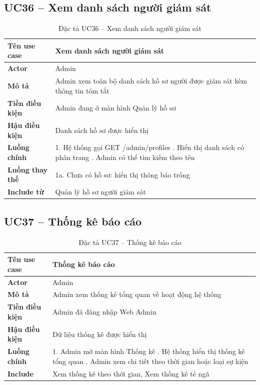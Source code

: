 \subsection*{UC36 -- Xem danh sách người giám sát}
\begin{table}[H]
    \captionsetup{justification=raggedright, singlelinecheck=false}
    \caption{Đặc tả UC36 -- Xem danh sách người giám sát}
\centering
\begin{tabular}{|p{3.5cm}|p{10cm}|}
\hline
\textbf{Tên use case} & Xem danh sách người giám sát \\
\hline
\textbf{Actor} & Admin \\
\hline
\textbf{Mô tả} & Admin xem toàn bộ danh sách hồ sơ người
  được giám sát kèm thông tin tóm tắt \\
\hline
\textbf{Tiền điều kiện} & Admin đang ở màn hình Quản lý
  hồ sơ \\
\hline
\textbf{Hậu điều kiện} & Danh sách hồ sơ được hiển thị \\
\hline
\textbf{Luồng chính} &
  1. Hệ thống gọi GET /admin/profiles \newline
  2. Hiển thị danh sách có phân trang \newline
  3. Admin có thể tìm kiếm theo tên \\
\hline
\textbf{Luồng thay thế} &
  1a. Chưa có hồ sơ: hiển thị thông báo trống \\
\hline
\textbf{Include từ} & Quản lý hồ sơ người giám sát \\
\hline
\end{tabular}

\end{table}

\subsection*{UC37 -- Thống kê báo cáo}
\begin{table}[H]
    \captionsetup{justification=raggedright, singlelinecheck=false}
    \caption{Đặc tả UC37 -- Thống kê báo cáo}
\centering
\begin{tabular}{|p{3.5cm}|p{10cm}|}
\hline
\textbf{Tên use case} & Thống kê báo cáo \\
\hline
\textbf{Actor} & Admin \\
\hline
\textbf{Mô tả} & Admin xem thống kê tổng quan về hoạt động
  hệ thống \\
\hline
\textbf{Tiền điều kiện} & Admin đã đăng nhập Web Admin \\
\hline
\textbf{Hậu điều kiện} & Dữ liệu thống kê được hiển thị \\
\hline
\textbf{Luồng chính} &
  1. Admin mở màn hình Thống kê \newline
  2. Hệ thống hiển thị thống kê tổng quan \newline
  3. Admin xem chi tiết theo thời gian hoặc
     loại sự kiện \\
\hline
\textbf{Include} & Xem thống kê theo thời gian,
  Xem thống kê té ngã \\
\hline
\end{tabular}

\end{table}

